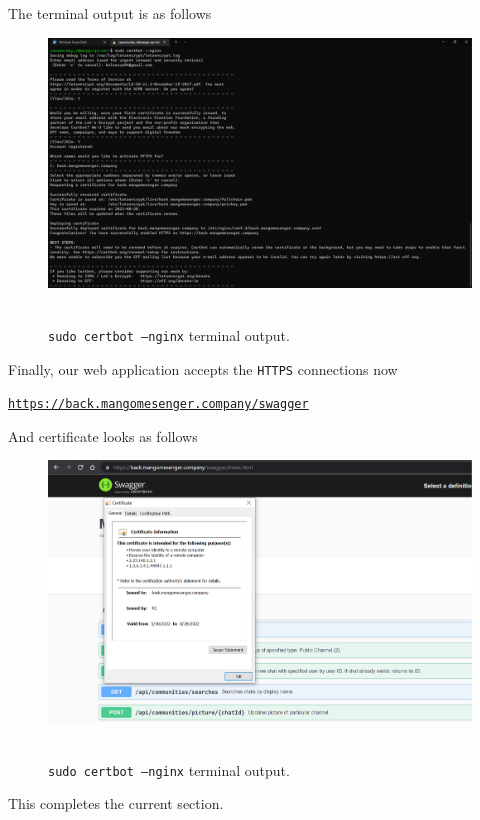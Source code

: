 The terminal output is as follows
\begin{figure}[H]
    \centering
    \includegraphics[width=1\textwidth]{img/07_certbot_nginx}
    ~\caption{\texttt{sudo certbot --nginx} terminal output.}\label{fig:figure22}
\end{figure}

Finally, our web application accepts the \texttt{HTTPS} connections now
\begin{center}
    \href{https://back.mangomesenger.company/swagger}{\texttt{https://back.mangomesenger.company/swagger}}
\end{center}
And certificate looks as follows
\begin{figure}[H]
    \centering
    \includegraphics[width=1\textwidth]{img/07_https_browser_output}
    ~\caption{\texttt{sudo certbot --nginx} terminal output.}\label{fig:figure23}
\end{figure}
This completes the current section.
